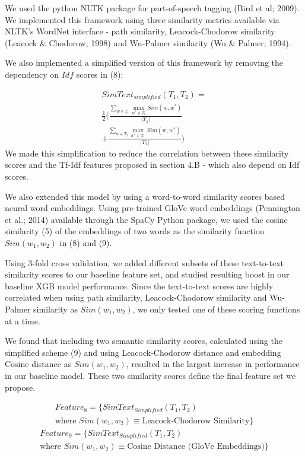 \documentclass[letterpaper, 10 pt, conference]{ieeeconf}  %
\DeclareMathOperator*{\maxU}{max}
\begin{document}
We used the python NLTK package for part-of-speech tagging (Bird et al; 2009). We implemented this framework using three similarity metrics available via NLTK’s WordNet interface - path similarity, Leacock-Chodorow similarity (Leacock \& Chodorow; 1998) and Wu-Palmer similarity (Wu \& Palmer; 1994). 

We also implemented a simplified version of this framework by removing the dependency on $Idf$ scores in (8):

\begin{gather*} \tag{9}
SimText_{simplified}(T_1,T_2) = \\ \frac{1}{2}\Big( \frac{\sum_{w \in T_1}{\maxU_{w^* \in T_2}Sim(w,w^*)}}{|T_1|} \\ + \frac{\sum_{w \in T_2}{\maxU_{w^* \in T_1}Sim(w,w^*)}}{|T_2|} \Big)
\end{gather*}
We made this simplification to reduce the correlation between these similarity scores and the Tf-Idf features proposed in section 4.B - which also depend on Idf scores.

We also extended this model by using a word-to-word similarity scores based neural word embeddings. Using pre-trained GloVe word embeddings (Pennington et al.; 2014) available through the SpaCy Python package, we used the cosine similarity (5) of the embeddings of two words as the similarity function $Sim(w_1,w_2)$ in (8) and (9). 

Using 3-fold cross validation, we added different subsets of these text-to-text similarity scores to our baseline feature set, and studied resulting boost in our baseline XGB model performance. Since the text-to-text scores are highly correlated when using path similarity, Leacock-Chodorow similarity and Wu-Palmer similarity as $Sim(w_1, w_2)$, we only tested one of these scoring functions at a time. 

We found that including two semantic similarity scores, calculated using the simplified scheme (9) and using Leacock-Chodorow distance and embedding Cosine distance as $Sim(w_1, w_2)$, resulted in the largest increase in performance in our baseline model. These two similarity scores define the final feature set we propose. 

\begin{gather*} \tag{10}
Feature_{8} = \{SimText_{Simplified}(T_1, T_2) \\ \text{where } Sim(w_1, w_2) \equiv \text{Leacock-Chodorow Similarity}\}
\end{gather*}
\begin{gather*} \tag{11}
Feature_{9} = \{SimText_{Simplified}(T_1, T_2) \\ \text{where } Sim(w_1, w_2) \equiv \text{Cosine Distance (GloVe Embeddings)}\}
\end{gather*}
\end{document}
